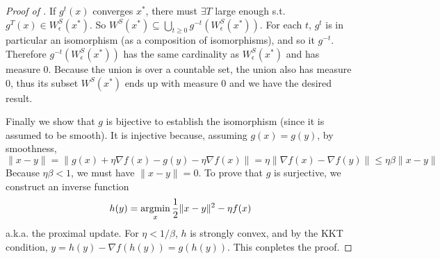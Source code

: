 \begin{example}
\begin{proof}[Proof of ]
If $g^t(x)$ converges $x^*$, there must $\exists T$ large enough s.t. $g^T(x)\in W_\epsilon^S(x^*)$. 
So $W^S(x^*)\subseteq \bigcup_{t\geq 0 }g^{-t}(W_\epsilon^S(x^*))$.
For each $t$, $g^t$ is in particular an isomorphism (as a composition of isomorphisms), and so it $g^{-t}$.
Therefore $g^{-t}(W_\epsilon^S(x^*))$ has the same cardinality as 
$W_\epsilon^S(x^*)$ and has measure 0. Because the union is over a countable set, the union also has measure 0, thus its subset $W^S(x^*)$ ends up with measure 0 and we have the desired result.

Finally we show that $g$ is bijective to establish the isomorphism (since it is assumed to be smooth). It is injective because, assuming $g(x) = g(y)$, by smoothness,
$$
\|x-y\| = \|g(x) + \eta\nabla f(x) - g(y) - \eta\nabla f(x) \|
 = \eta\|\nabla f(x) - \nabla f(y)\|\leq \eta\beta\|x-y\|
$$
Because $\eta\beta < 1$, we must have $\|x-y\|=0$.
To prove that $g$ is surjective, we construct an inverse function
$$h(y) = \mathop{\rm argmin}_x \frac{1}{2}\|x-y\|^2 - \eta f(x)$$
a.k.a. the proximal update. For $\eta < 1/\beta$, $h$ is strongly convex, and by the KKT condition,
$y = h(y) - \nabla f(h(y)) = g(h(y))$. This conpletes the proof.
\end{proof}

\end{example}

